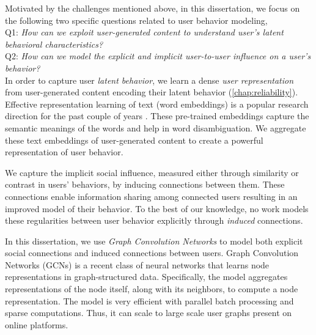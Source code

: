 Motivated by the challenges mentioned above, in this dissertation, we focus on the following two specific questions related to user behavior modeling,\\

\noindent
Q1: \emph{How can we exploit user-generated content to understand user's latent behavioral characteristics?}\\

\noindent
Q2: \emph{How can we model the explicit and implicit user-to-user influence on a user's behavior?}\\


In order to capture user \emph{latent behavior}, we learn a dense \emph{user representation} from user-generated content encoding their latent behavior (\cref{chap:reliability}).
Effective representation learning of text (word embeddings) is a popular research direction for the past couple of years \cite{mikolov2013distributed, glove, devlin2019bert}. These pre-trained embeddings capture the semantic meanings of the words and help in word disambiguation.
We aggregate these text embeddings of user-generated content to create a powerful representation of user behavior.

We capture the implicit social influence, measured either through similarity or contrast in users' behaviors, by inducing connections between them. These connections enable information sharing among connected users resulting in an improved model of their behavior. To the best of our knowledge, no work models these regularities between user behavior explicitly through \emph{induced} connections.

In this dissertation, we use \emph{Graph Convolution Networks} \cite{gcn} to model both explicit social connections and induced connections between users.
Graph Convolution Networks (GCNs) is a recent class of neural networks that learns node representations in graph-structured data. Specifically, the model aggregates representations of the node itself, along with its neighbors, to compute a node representation. The model is very efficient with parallel batch processing and sparse computations. Thus, it can scale to large scale user graphs present on online platforms.

